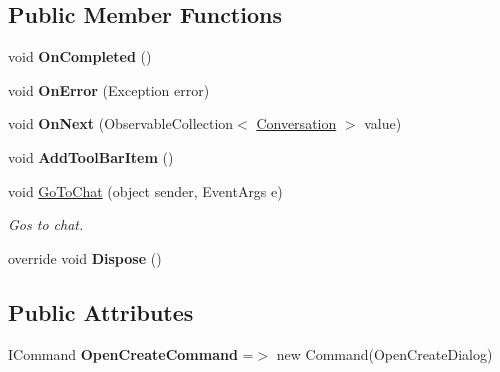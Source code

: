 \subsection*{Public Member Functions}
\begin{DoxyCompactItemize}
\item 
\mbox{\label{class_tutor_scout24_1_1_view_models_1_1_message_view_model_a06987f821333acaf2713b148c223fe1f}} 
void {\bfseries On\+Completed} ()
\item 
\mbox{\label{class_tutor_scout24_1_1_view_models_1_1_message_view_model_a84ec0a4c1d4bee04c954cadc22cb5e20}} 
void {\bfseries On\+Error} (Exception error)
\item 
\mbox{\label{class_tutor_scout24_1_1_view_models_1_1_message_view_model_a0de1ad9d37b2e65c47a2de4bd8df558a}} 
void {\bfseries On\+Next} (Observable\+Collection$<$ \mbox{\hyperlink{class_tutor_scout24_1_1_models_1_1_chat_1_1_conversation}{Conversation}} $>$ value)
\item 
\mbox{\label{class_tutor_scout24_1_1_view_models_1_1_message_view_model_acf2f21a56736d5ee83d8b204433ef8f3}} 
void {\bfseries Add\+Tool\+Bar\+Item} ()
\item 
void \mbox{\hyperlink{class_tutor_scout24_1_1_view_models_1_1_message_view_model_ad4ca19244326d28fed25ee600004c936}{Go\+To\+Chat}} (object sender, Event\+Args e)
\begin{DoxyCompactList}\small\item\em Gos to chat. \end{DoxyCompactList}\item 
\mbox{\label{class_tutor_scout24_1_1_view_models_1_1_message_view_model_a1be73e30fc8d2bfab1cb2b0fcec03a05}} 
override void {\bfseries Dispose} ()
\end{DoxyCompactItemize}
\subsection*{Public Attributes}
\begin{DoxyCompactItemize}
\item 
\mbox{\label{class_tutor_scout24_1_1_view_models_1_1_message_view_model_a7777d7e7630f8fb45e03b48cb09a069f}} 
I\+Command {\bfseries Open\+Create\+Command} =$>$ new Command(Open\+Create\+Dialog)
\end{DoxyCompactItemize}
